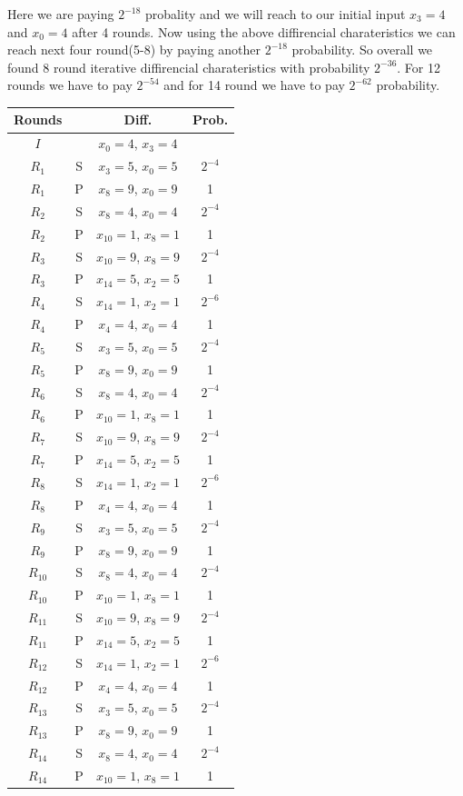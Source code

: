 \documentclass[journal=tosc,preprint]{iacrtrans}
\begin{document}
Here we are paying $2^{-18}$ probality and we will reach to our initial input $x_3 = 4$ and $x_0 = 4$ after 4 rounds. Now using the above diffirencial charateristics we can reach next four round(5-8) by paying another $2^{-18}$ probability. So overall we found 8 round iterative diffirencial charateristics with probability $2^{-36}$. For 12 rounds we have to pay $2^{-54}$ and for 14 round we have to pay $2^{-62}$ probability.
\begin{table}[h!]
	\centering
	\begin{tabular}{ |c||c|c|c| }
		\hline
		Rounds & & Diff. & Prob. \\ \hline \hline
		$I$&  & $x_0 = 4$, $x_{3} = 4$ &  \\
		$R_1$& S & $x_3 = 5$, $x_{0} = 5$ & $2^{-4}$ \\
		$R_1$& P & $x_8 = 9$, $x_{0} = 9$ & 1 \\
		$R_2$& S & $x_8 = 4$, $x_{0} = 4$ & $2^{-4}$ \\
		$R_2$& P & $x_{10} = 1$, $x_{8} = 1$ & 1 \\
		$R_3$& S & $x_{10} = 9$, $x_{8} = 9$ & $2^{-4}$ \\
		$R_3$& P & $x_{14} = 5$, $x_{2} = 5$ & 1 \\
		$R_4$& S & $x_{14} = 1$, $x_{2} = 1$  & $2^{-6}$ \\
		$R_4$& P & $x_4 = 4$, $x_0 = 4$ & 1 \\
		$R_5$& S & $x_3 = 5$, $x_{0} = 5$ & $2^{-4}$ \\
		$R_5$& P & $x_8 = 9$, $x_{0} = 9$ & 1 \\
		$R_6$& S & $x_8 = 4$, $x_{0} = 4$ & $2^{-4}$ \\
		$R_6$& P & $x_{10} = 1$, $x_{8} = 1$ & 1 \\
		$R_7$& S & $x_{10} = 9$, $x_{8} = 9$ & $2^{-4}$ \\
		$R_7$& P & $x_{14} = 5$, $x_{2} = 5$ & 1 \\
		$R_8$& S & $x_{14} = 1$, $x_{2} = 1$  & $2^{-6}$ \\
		$R_8$& P & $x_4 = 4$, $x_0 = 4$ & 1 \\
		$R_9$& S & $x_3 = 5$, $x_{0} = 5$ & $2^{-4}$ \\
		$R_9$& P & $x_8 = 9$, $x_{0} = 9$ & 1 \\
		$R_{10}$& S & $x_8 = 4$, $x_{0} = 4$ & $2^{-4}$ \\
		$R_{10}$& P & $x_{10} = 1$, $x_{8} = 1$ & 1 \\
		$R_{11}$& S & $x_{10} = 9$, $x_{8} = 9$ & $2^{-4}$ \\
		$R_{11}$& P & $x_{14} = 5$, $x_{2} = 5$ & 1 \\
		$R_{12}$& S & $x_{14} = 1$, $x_{2} = 1$  & $2^{-6}$ \\
		$R_{12}$& P & $x_4 = 4$, $x_0 = 4$ & 1 \\
		$R_{13}$& S & $x_3 = 5$, $x_{0} = 5$ & $2^{-4}$ \\
		$R_{13}$& P & $x_8 = 9$, $x_{0} = 9$ & 1 \\
		$R_{14}$& S & $x_8 = 4$, $x_{0} = 4$ & $2^{-4}$ \\
		$R_{14}$& P & $x_{10} = 1$, $x_{8} = 1$ & 1 \\
		\hline
	\end{tabular}
\end{table}
\end{document}
